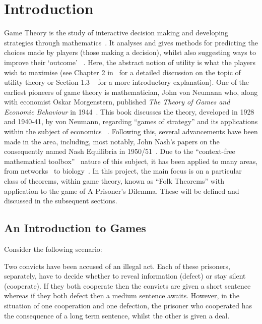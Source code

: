 \chapter{Introduction}\label{ch:Introduction}

Game Theory is the study of interactive decision making and developing
strategies through mathematics~\cite{Dictionary2013}. It analyses and gives
methods for predicting the choices made by players (those making a decision),
whilst also suggesting ways to improve their `outcome'
~\cite{maschler_solan_zamir_2013}. Here, the abstract notion of utility is what
the players wish to maximise (see Chapter 2 in~\cite{maschler_solan_zamir_2013}
for a detailed discussion on the topic of utility theory or Section 1.3
~\cite{Webb2007} for a more introductory explanation). One of the earliest
pioneers of game theory is mathematician, John von Neumann who, along with
economist Oskar Morgenstern, published \textit{The Theory of Games and Economic
Behaviour} in 1944~\cite{maschler_solan_zamir_2013}. This book discusses the
theory, developed in 1928 and 1940-41, by von Neumann, regarding ``games of
strategy'' and its applications within the subject of economics
~\cite{von2007theory}. Following this, several advancements have been made in
the area, including, most notably, John Nash's papers on the consequently named
Nash Equilibria in 1950/51~\cite{nash1950equilibrium, nash1951non}. Due to the
``context-free mathematical toolbox''~\cite{maschler_solan_zamir_2013} nature of
this subject, it has been applied to many areas, from
networks~\cite{liang2012game, 1593279} to biology~\cite{chen2009robust, 
adeoye2012application}. In this project, the main focus is on a
particular class of theorems, within game theory, known as ``Folk Theorems''
with application to the game of A Prisoner's Dilemma. These will be defined and
discussed in the subsequent sections.

\section{An Introduction to Games}\label{sec:An_Intro_to_Games}
Consider the following scenario:

\begin{center}
    Two convicts have been accused of an illegal act. Each of these prisoners,
    separately, have to decide whether to reveal information (defect) or stay
    silent (cooperate). If they both cooperate then the convicts are given a
    short sentence whereas if they both defect then a medium sentence awaits.
    However, in the situation of one cooperation and one defection, the prisoner
    who cooperated has the consequence of a long term sentence, whilst the other
    is given a deal.~\cite{Knight2017}
\end{center}

